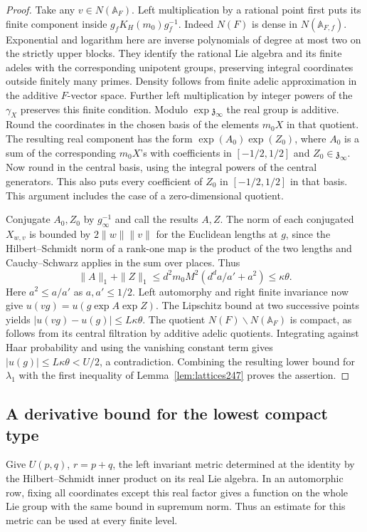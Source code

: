 \documentclass[a4paper,11pt]{article}
\theoremstyle{definition}
\theoremstyle{remark}
\numberwithin{equation}{section}
\begin{document}
\begin{proof}
Take any \(v\in N(\mathbb A_F)\). Left multiplication by a rational
point first puts its finite component inside \(g_f K_H(m_0)g_f^{-1}\).
Indeed \(N(F)\) is dense in \(N(\mathbb A_{F,f})\). Exponential and
logarithm here are inverse polynomials of degree at most two on the
strictly upper blocks. They identify the rational Lie algebra and its
finite adeles with the corresponding unipotent groups, preserving
integral coordinates outside finitely many primes. Density follows
from finite adelic approximation in the additive \(F\)-vector space.
Further left multiplication by integer powers of the \(\gamma_X\)
preserves this finite condition. Modulo \(\exp\mathfrak z_\infty\)
the real group is additive. Round the coordinates in the chosen
basis of the elements \(m_0 X\) in that quotient. The resulting real
component has the form \(\exp(A_0)\exp(Z_0)\), where \(A_0\) is a sum
of the corresponding \(m_0 X\)'s with coefficients in \([-1/2,1/2]\)
and \(Z_0\in\mathfrak z_\infty\). Now round in the central basis,
using the integral powers of the central generators. This also puts
every coefficient of \(Z_0\) in \([-1/2,1/2]\) in that basis.
This argument includes the case of a zero-dimensional quotient.

Conjugate \(A_0,Z_0\) by \(g_\infty^{-1}\) and call the results
\(A,Z\). The norm of each conjugated \(X_{w,v}\) is bounded by
\(2\|w\|\|v\|\) for the Euclidean lengths at \(g\), since the
Hilbert--Schmidt norm of a rank-one map is the product of the two
lengths and Cauchy--Schwarz applies in the sum over places. Thus
\[
   \|A\|_1+\|Z\|_1
      \le d^2m_0M^2(d^d a/a'+a^2)\le\kappa\theta .
\]
Here \(a^2\le a/a'\) as \(a,a'\le1/2\). Left automorphy and right
finite invariance now give \(u(vg)=u(g\exp A\exp Z)\). The Lipschitz
bound at two successive points yields \(|u(vg)-u(g)|\le L\kappa\theta\).
The quotient \(N(F)\backslash N(\mathbb A_F)\) is compact, as follows
from its central filtration by additive adelic quotients. Integrating
against Haar probability and using the vanishing constant term gives
\(|u(g)|\le L\kappa\theta<U/2\), a contradiction. Combining the
resulting lower bound for \(\lambda_1\) with the first inequality of
Lemma~\ref{lem:lattices247} proves the assertion.
\end{proof}

\subsection{A derivative bound for the lowest compact type}\label{nav:VI-36}
Give \(U(p,q)\), \(r=p+q\), the left invariant metric determined at
the identity by the Hilbert--Schmidt inner product on its real Lie algebra.
In an automorphic row, fixing all coordinates except this real
factor gives a function on the whole Lie group with the same bound
in supremum norm. Thus an estimate for this metric can be used at
every finite level.
\end{document}
